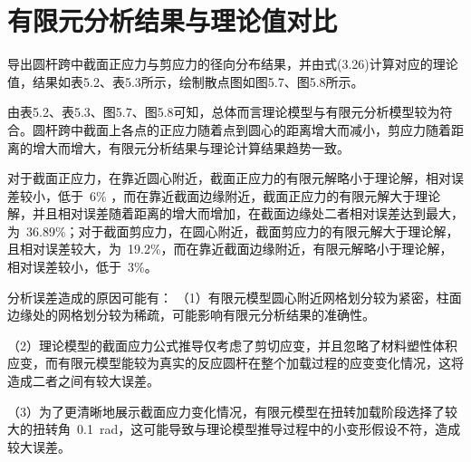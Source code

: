 \section{有限元分析结果与理论值对比}
导出圆杆跨中截面正应力与剪应力的径向分布结果，并由式(3.26)计算对应的理论值，结果如表5.2、表5.3所示，绘制散点图如图5.7、图5.8所示。


由表5.2、表5.3、图5.7、图5.8可知，总体而言理论模型与有限元分析模型较为符合。圆杆跨中截面上各点的正应力随着点到圆心的距离增大而减小，剪应力随着距离的增大而增大，有限元分析结果与理论计算结果趋势一致。

对于截面正应力，在靠近圆心附近，截面正应力的有限元解略小于理论解，相对误差较小，低于~6\% ，而在靠近截面边缘附近，截面正应力的有限元解大于理论解，并且相对误差随着距离的增大而增加，在截面边缘处二者相对误差达到最大，为~36.89\%；对于截面剪应力，在圆心附近，截面剪应力的有限元解大于理论解，且相对误差较大，为~19.2\%，而在靠近截面边缘附近，有限元解略小于理论解，相对误差较小，低于~3\%。

分析误差造成的原因可能有：
（1）有限元模型圆心附近网格划分较为紧密，柱面边缘处的网格划分较为稀疏，可能影响有限元分析结果的准确性。

（2）理论模型的截面应力公式推导仅考虑了剪切应变，并且忽略了材料塑性体积应变，而有限元模型能较为真实的反应圆杆在整个加载过程的应变变化情况，这将造成二者之间有较大误差。

（3）为了更清晰地展示截面应力变化情况，有限元模型在扭转加载阶段选择了较大的扭转角~0.1~rad，这可能导致与理论模型推导过程中的小变形假设不符，造成较大误差。





